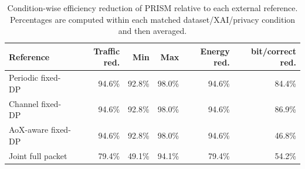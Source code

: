 \begin{table}[htbp]\centering\small
\caption{Condition-wise efficiency reduction of PRISM relative to each external reference. Percentages are computed within each matched dataset/XAI/privacy condition and then averaged.}
\label{tab:reduction-scorecard}
\begin{tabular}{lrrrrr}
\toprule
Reference & Traffic red. & Min & Max & Energy red. & bit/correct red. \\
\midrule
Periodic fixed-DP & 94.6\% & 92.8\% & 98.0\% & 94.6\% & 84.4\% \\
Channel fixed-DP & 94.6\% & 92.8\% & 98.0\% & 94.6\% & 86.9\% \\
AoX-aware fixed-DP & 94.6\% & 92.8\% & 98.0\% & 94.6\% & 46.8\% \\
Joint full packet & 79.4\% & 49.1\% & 94.1\% & 79.4\% & 54.2\% \\
\bottomrule
\end{tabular}
\end{table}